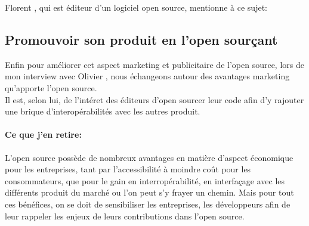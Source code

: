 			Florent , qui est éditeur d'un logiciel open source, mentionne à ce sujet:

			\begin{center}
					\textit{
					}
			\end{center}

		\subsection{Promouvoir son produit en l'open sourçant}

			Enfin pour améliorer cet aspect marketing et publicitaire de l'open source, lors de mon interview avec Olivier , nous échangeons autour des avantages marketing qu'apporte l'open source.\\

			Il est, selon lui,  de l'intéret des éditeurs d'open sourcer leur code afin d'y rajouter une brique d'interopérabilités avec les autres produit.

			\begin{center}
				\textit{
					}
			\end{center}


			\paragraph{Ce que j'en retire:\\}

				L'open source possède de nombreux avantages en matière d'aspect économique pour les entreprises, tant par l'accessibilité à moindre coût pour les consommateurs, que pour le gain en interropérabilité, en interfaçage avec les différents produit du marché ou l'on peut s'y frayer un chemin. Mais pour tout ces bénéfices, on se doit de sensibiliser les entreprises, les développeurs afin de leur rappeler les enjeux de leurs contributions dans l'open source.









